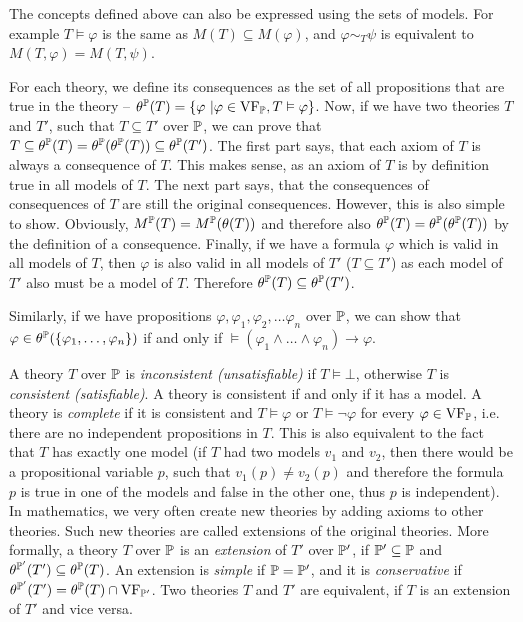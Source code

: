 The concepts defined above can also be expressed using the sets of models. For example $T \vDash \varphi$ is the same as $M(T) \subseteq M(\varphi)$, and $\varphi \sim_T \psi$ is equivalent to $M(T, \varphi) = M(T, \psi)$.

For each theory, we define its consequences as the set of all propositions that are true in the theory -- $\theta^\mathbb{P}(T) = \{\varphi\ | \varphi \in \operatorname{VF}_\mathbb{P}, T \vDash \varphi \}$. Now, if we have two theories $T$ and $T'$, such that $T \subseteq T'$ over $\mathbb{P}$, we can prove that $T \subseteq \theta^\mathbb{P}(T) = \theta^\mathbb{P}(\theta^\mathbb{P}(T)) \subseteq \theta^\mathbb{P}(T')$. The first part says, that each axiom of $T$ is always a consequence of $T$. This makes sense, as an axiom of $T$ is by definition true in all models of $T$. The next part says, that the consequences of consequences of $T$ are still the original consequences. However, this is also simple to show. Obviously, $M^\mathbb{P}(T) = M^\mathbb{P}(\theta(T))$ and therefore also $\theta^\mathbb{P}(T) = \theta^\mathbb{P}(\theta^\mathbb{P}(T))$ by the definition of a consequence. Finally, if we have a formula $\varphi$ which is valid in all models of $T$, then $\varphi$ is also valid in all models of $T'$ ($T \subseteq T'$) as each model of $T'$ also must be a model of $T$. Therefore $\theta^\mathbb{P}(T) \subseteq \theta^\mathbb{P}(T')$.

Similarly, if we have propositions $\varphi, \varphi_1, \varphi_2, \dots \varphi_n$ over $\mathbb{P}$, we can show that $\varphi \in \theta^\mathbb{P}(\{\varphi_1, \dots, \varphi_n\})$ if and only if $\vDash (\varphi_1 \land \dots \land \varphi_n) \to \varphi$.

A theory $T$ over $\mathbb{P}$ is \emph{inconsistent (unsatisfiable)} if $T \vDash \bot$, otherwise $T$ is \emph{consistent (satisfiable)}. A theory is consistent if and only if it has a model. A theory is \emph{complete} if it is consistent and $T\vDash \varphi$ or $T \vDash \neg \varphi$ for every $\varphi \in \operatorname{VF}_\mathbb{P}$, i.e. there are no independent propositions in $T$. This is also equivalent to the fact that $T$ has exactly one model (if $T$ had two models $v_1$ and $v_2$, then there would be a propositional variable $p$, such that $v_1(p) \neq v_2(p)$ and therefore the formula $p$ is true in one of the models and false in the other one, thus $p$ is independent). In mathematics, we very often create new theories by adding axioms to other theories. Such new theories are called extensions of the original theories. More formally, a theory $T$ over $\mathbb{P}$ is an \emph{extension} of $T'$ over $\mathbb{P}'$, if $\mathbb{P}' \subseteq \mathbb{P}$ and $\theta^{\mathbb{P}'}(T') \subseteq \theta^\mathbb{P}(T)$. An extension is \emph{simple} if $\mathbb{P} = \mathbb{P}'$, and it is \emph{conservative} if $\theta^{\mathbb{P}'}(T') = \theta^\mathbb{P}(T) \cap \operatorname{VF}_{\mathbb{P}'}$. Two theories $T$ and $T'$ are equivalent, if $T$ is an extension of $T'$ and vice versa.


